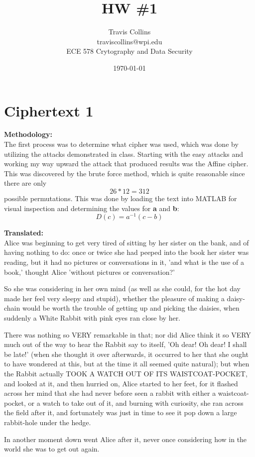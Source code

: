\documentclass[12pt]{article}
\title{HW \#1}
\author{
        Travis Collins \\
	traviscollins@wpi.edu \\
	ECE 578 Crytography and Data Security
}
\date{\today}
\begin{document}
\maketitle


\section{Ciphertext 1}
\textbf{Methodology:}\\
The first process was to determine what cipher was used, which was done by utilizing the attacks demonstrated in class.  Starting with the easy attacks and working my way upward the attack that produced results was the Affine cipher.  This was discovered by the brute force method, which is quite reasonable since there are only \[ 26 * 12 = 312 \] possible permutations.  This was done by loading the text into MATLAB for visual inspection and determining the values for \textbf{a} and \textbf{b}: \[D(c)=a^{-1}(c-b)\]

\noindent
\textbf{Translated:}\\
Alice was beginning to get very tired of sitting by her sister on the
bank, and of having nothing to do: once or twice she had peeped into the
book her sister was reading, but it had no pictures or conversations in
it, ’and what is the use of a book,’ thought Alice ’without pictures or
conversation?’

So she was considering in her own mind (as well as she could, for the
hot day made her feel very sleepy and stupid), whether the pleasure
of making a daisy-chain would be worth the trouble of getting up and
picking the daisies, when suddenly a White Rabbit with pink eyes ran
close by her.

There was nothing so VERY remarkable in that; nor did Alice think it so
VERY much out of the way to hear the Rabbit say to itself, ’Oh dear!
Oh dear! I shall be late!’ (when she thought it over afterwards, it
occurred to her that she ought to have wondered at this, but at the time
it all seemed quite natural); but when the Rabbit actually TOOK A WATCH
OUT OF ITS WAISTCOAT-POCKET, and looked at it, and then hurried on,
Alice started to her feet, for it flashed across her mind that she had
never before seen a rabbit with either a waistcoat-pocket, or a watch
to take out of it, and burning with curiosity, she ran across the field
after it, and fortunately was just in time to see it pop down a large
rabbit-hole under the hedge.

In another moment down went Alice after it, never once considering how
in the world she was to get out again.
\end{document}
